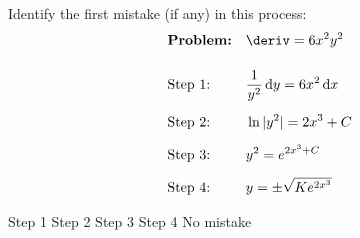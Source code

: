 \begin{questions}
    \question Identify the first mistake (if any) in this process: \begin{align*}
        & \textbf{Problem:} && \deriv = 6x^2y^2 \\[11pt]
        & \text{Step 1:} && \dfrac{1}{y^2} \,\mathrm{d}y = 6x^2 \,\mathrm{d}x \\[5.5pt]
        & \text{Step 2:} && \ln |y^2| = 2x^3 + C \\[5.5pt]
        & \text{Step 3:} && y^2 = e^{2x^3 + C} \\[5.5pt]
        & \text{Step 4:} && y = \pm\sqrt{Ke^{2x^3}}
    \end{align*}

    \begin{oneparchoices}
        \choice Step 1
        \choice Step 2
        \choice Step 3
        \choice Step 4
        \choice No mistake
    \end{oneparchoices} \par \horizontalline
\end{questions}
